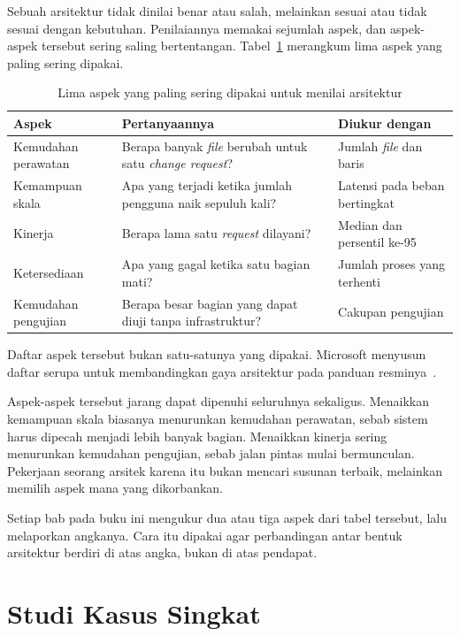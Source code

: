 Sebuah arsitektur tidak dinilai benar atau salah, melainkan sesuai atau tidak
sesuai dengan kebutuhan. Penilaiannya memakai sejumlah aspek, dan aspek-aspek
tersebut sering saling bertentangan. Tabel~\ref{tab:aspek} merangkum lima aspek
yang paling sering dipakai.

\begin{table}[htbp]
  \centering
  \caption{Lima aspek yang paling sering dipakai untuk menilai arsitektur}
  \label{tab:aspek}
  \begin{tabularx}{\textwidth}{|l|X|X|}
    \hline
    \textbf{Aspek} & \textbf{Pertanyaannya} & \textbf{Diukur dengan} \\
    \hline
    Kemudahan perawatan & Berapa banyak \textit{file} berubah untuk satu \textit{change request}? & Jumlah \textit{file} dan baris \\
    \hline
    Kemampuan skala & Apa yang terjadi ketika jumlah pengguna naik sepuluh kali? & Latensi pada beban bertingkat \\
    \hline
    Kinerja & Berapa lama satu \textit{request} dilayani? & Median dan persentil ke-95 \\
    \hline
    Ketersediaan & Apa yang gagal ketika satu bagian mati? & Jumlah proses yang terhenti \\
    \hline
    Kemudahan pengujian & Berapa besar bagian yang dapat diuji tanpa infrastruktur? & Cakupan pengujian \\
    \hline
  \end{tabularx}
\end{table}

Daftar aspek tersebut bukan satu-satunya yang dipakai. Microsoft menyusun
daftar serupa untuk membandingkan gaya arsitektur pada panduan
resminya~\cite{microsoft2024webapps}.

Aspek-aspek tersebut jarang dapat dipenuhi seluruhnya sekaligus. Menaikkan
kemampuan skala biasanya menurunkan kemudahan perawatan, sebab sistem harus
dipecah menjadi lebih banyak bagian. Menaikkan kinerja sering menurunkan
kemudahan pengujian, sebab jalan pintas mulai bermunculan. Pekerjaan seorang
arsitek karena itu bukan mencari susunan terbaik, melainkan memilih aspek mana
yang dikorbankan.

Setiap bab pada buku ini mengukur dua atau tiga aspek dari tabel tersebut, lalu
melaporkan angkanya. Cara itu dipakai agar perbandingan antar bentuk arsitektur
berdiri di atas angka, bukan di atas pendapat.

\section{Studi Kasus Singkat}

